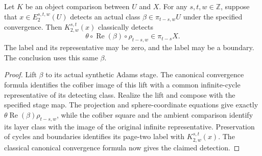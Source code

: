 \begin{theorem}
\label{sem:Literature:lambda-inversion-detection}
Let $K$ be an object comparison between $U$ and $X$. For any
$s,t,w\in\mathbb Z$, suppose that
$x\in E_2^{s,t,w}(U)$ detects an actual class
$\beta\in\pi_{t-s,w}U$ under the specified convergence. Then
$K_{2,w}^{s,t}(x)$ classically detects
\[
\theta\circ\operatorname{Re}(\beta)\circ\rho_{t-s,w}
\in\pi_{t-s}X.
\]
The label and its representative may be zero, and the label may be a
boundary. The conclusion uses this same $\beta$.
\end{theorem}
\begin{proof}
Lift $\beta$ to its actual synthetic Adams stage. The canonical
convergence formula identifies the cofiber image of this lift with a
common infinite-cycle representative of its detecting class. Realize
the lift and compose with the specified stage map. The projection and
sphere-coordinate equations give exactly
$\theta\operatorname{Re}(\beta)\rho_{t-s,w}$, while the cofiber square
and the ambient comparison identify its layer class with the image of
the original infinite representative. Preservation of cycles and
boundaries identifies its page-two label with $K_{2,w}^{s,t}(x)$.
The classical canonical convergence formula now gives the claimed
detection.
\end{proof}


